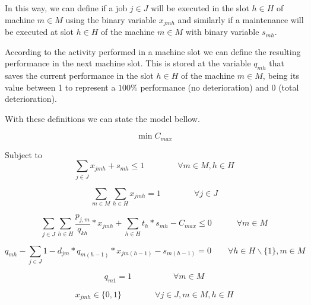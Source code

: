 \documentclass[a4paper,11pt]{article}
\begin{document}
In this way, we can define if a job $j \in J$ will be executed in the slot $h \in H$ of machine $m \in M$  using the binary variable $x_{jmh}$ and similarly if a maintenance will be executed at slot $h \in H$ of the machine $m \in M$ with binary variable $s_{mh}$.

According to the activity performed in a machine slot we can define the resulting performance in the next machine slot. This is stored at the variable $q_{mh}$ that saves the current performance in the slot $h \in H$ of the machine $m \in M$, being its value between 1 to represent a $100\%$ performance (no deterioration) and 0 (total deterioration).

With these definitions we can state the model bellow. 

\begin{equation}\label{eq:fo_mod1}
	\min C_{max}
\end{equation}

Subject to
\begin{equation}\label{eq:uniqueAct_mod1}	
 \sum_{j \in J}{x_{jmh}} +  s_{mh} \leq 1 \quad\quad\quad\quad \forall m \in M, h \in H 
\end{equation}

\begin{equation}\label{eq:mandJob_mod1}
	\sum_{m \in M}\sum_{h \in H}{x_{jmh}} = 1 \quad\quad\quad\quad \forall j \in J
\end{equation}
 
\begin{equation}\label{eq:cMax_mod1}
	\sum_{j \in J}\sum_{h \in H}{\frac{p_{j,m}}{q_{kh}}*x_{jmh}} + \sum_{h \in H}{t_h}*s_{mh} - C_{max} \leq 0 \quad \quad \quad \forall m \in M 
\end{equation} 
 
\begin{equation}\label{eq:det_mod1}
	q_{mh} - \sum_{j \in J}{1-d_{jm}}*q_{m(h-1)}*x_{jm(h-1)} - s_{m(h-1)} = 0 \quad\quad \forall h \in H\backslash\{1\} , m \in M
\end{equation} 

\begin{equation}\label{eq:qInit_mod1}
q_{m1} = 1 \quad\quad\quad\quad\quad \forall m \in M
\end{equation}

\begin{equation}\label{eq:xDef_mod1}
    x_{jmh} \in \{0,1\} \quad \quad \quad \quad \forall j \in J, m \in M, h \in H
\end{equation}
\end{document}
